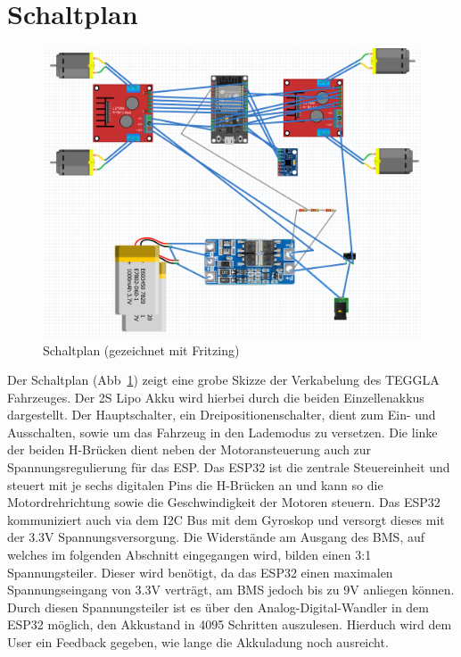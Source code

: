 \section{Schaltplan}
\begin{figure}[!ht]
	\centering
	\includegraphics[width=\textwidth]{bilder/schaltplan.png}
	\caption{Schaltplan (gezeichnet mit Fritzing)}
	\label{bild:schaltpaln}
\end{figure}
Der Schaltplan (Abb~\ref{bild:schaltpaln}) zeigt eine grobe Skizze der Verkabelung des TEGGLA Fahrzeuges. Der 2S Lipo Akku wird hierbei durch die beiden Einzellenakkus dargestellt.
Der Hauptschalter, ein Dreipositionenschalter, dient zum Ein- und Ausschalten, sowie um das Fahrzeug in den Lademodus zu versetzen. 
Die linke der beiden H-Brücken dient neben der Motoransteuerung auch zur Spannungsregulierung für das ESP. 
Das ESP32 ist die zentrale Steuereinheit und steuert mit je sechs digitalen Pins die H-Brücken an und kann so die Motordrehrichtung sowie die Geschwindigkeit der Motoren steuern.
Das ESP32 kommuniziert auch via dem I2C Bus mit dem Gyroskop und versorgt dieses mit der 3.3V Spannungsversorgung.
Die Widerstände am Ausgang des BMS, auf welches im folgenden Abschnitt eingegangen wird, bilden einen 3:1 Spannungsteiler.
Dieser wird benötigt, da das ESP32 einen maximalen Spannungseingang von 3.3V verträgt, am BMS jedoch bis zu 9V anliegen können. Durch diesen Spannungsteiler ist es über den Analog-Digital-Wandler in dem ESP32 möglich, den Akkustand in 4095 Schritten auszulesen.
Hierduch wird dem User ein Feedback gegeben, wie lange die Akkuladung noch ausreicht.

